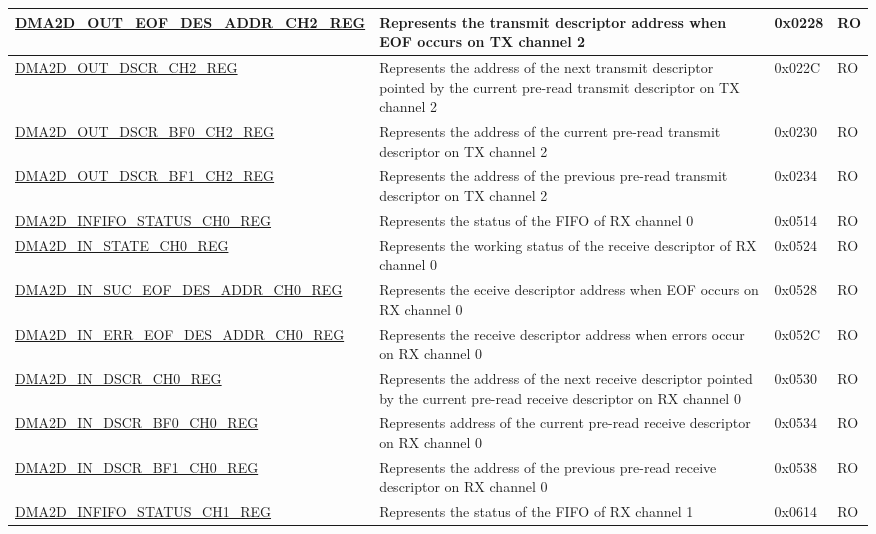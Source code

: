\begin{longtable}{ | p{7cm} | p{11.5cm} | p{1.3cm} | p{2cm} | }
\hyperref[regdesc:DMA2DOUTEOFDESADDRCHNREG]{DMA2D\_OUT\_EOF\_DES\_ADDR\_CH2\_REG} & Represents the transmit descriptor address when EOF occurs on TX channel 2 & 0x0228 & RO \\ \hline
\hyperref[regdesc:DMA2DOUTDSCRCHNREG]{DMA2D\_OUT\_DSCR\_CH2\_REG} & Represents the address of the next transmit descriptor pointed by the current pre-read transmit descriptor on TX channel 2 & 0x022C & RO \\ \hline
\hyperref[regdesc:DMA2DOUTDSCRBF0CHNREG]{DMA2D\_OUT\_DSCR\_BF0\_CH2\_REG} & Represents the address of the current pre-read transmit descriptor on TX channel 2 & 0x0230 & RO \\ \hline
\hyperref[regdesc:DMA2DOUTDSCRBF1CHNREG]{DMA2D\_OUT\_DSCR\_BF1\_CH2\_REG} & Represents the address of the previous pre-read transmit descriptor on TX channel 2 & 0x0234 & RO \\ \hline
\hyperref[regdesc:DMA2DINFIFOSTATUSCHNREG]{DMA2D\_INFIFO\_STATUS\_CH0\_REG} & Represents the status of the FIFO of RX channel 0 & 0x0514 & RO \\ \hline
\hyperref[regdesc:DMA2DINSTATECHNREG]{DMA2D\_IN\_STATE\_CH0\_REG} & Represents the working status of the receive descriptor of RX channel 0 & 0x0524 & RO \\ \hline
\hyperref[regdesc:DMA2DINSUCEOFDESADDRCHNREG]{DMA2D\_IN\_SUC\_EOF\_DES\_ADDR\_CH0\_REG} & Represents the eceive descriptor address when EOF occurs on RX channel 0 & 0x0528 & RO \\ \hline
\hyperref[regdesc:DMA2DINERREOFDESADDRCHNREG]{DMA2D\_IN\_ERR\_EOF\_DES\_ADDR\_CH0\_REG} & Represents the receive descriptor address when errors occur on RX channel 0 & 0x052C & RO \\ \hline
\hyperref[regdesc:DMA2DINDSCRCHNREG]{DMA2D\_IN\_DSCR\_CH0\_REG} & Represents the address of the next receive descriptor pointed by the current pre-read receive descriptor on RX channel 0 & 0x0530 & RO \\ \hline
\hyperref[regdesc:DMA2DINDSCRBF0CHNREG]{DMA2D\_IN\_DSCR\_BF0\_CH0\_REG} & Represents address of the current pre-read receive descriptor on RX channel 0 & 0x0534 & RO \\ \hline
\hyperref[regdesc:DMA2DINDSCRBF1CHNREG]{DMA2D\_IN\_DSCR\_BF1\_CH0\_REG} & Represents the address of the previous pre-read receive descriptor on RX channel 0 & 0x0538 & RO \\ \hline
\hyperref[regdesc:DMA2DINFIFOSTATUSCHNREG]{DMA2D\_INFIFO\_STATUS\_CH1\_REG} & Represents the status of the FIFO of RX channel 1 & 0x0614 & RO \\ \hline

\end{longtable}
